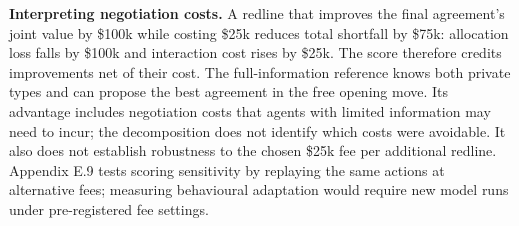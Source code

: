 \textbf{Interpreting negotiation costs.} A redline that improves the final agreement's joint value by
\$100k while costing \$25k reduces total shortfall by \$75k: allocation loss falls by \$100k and
interaction cost rises by \$25k. The score therefore credits improvements net of their cost. The
full-information reference knows both private types and can propose the best agreement in the
free opening move. Its advantage includes negotiation costs that agents with limited information
may need to incur; the decomposition does not identify which costs were avoidable. It also does
not establish robustness to the chosen \$25k fee per additional redline. Appendix E.9 tests
scoring sensitivity by replaying the same actions at alternative fees; measuring behavioural
adaptation would require new model runs under pre-registered fee settings.

